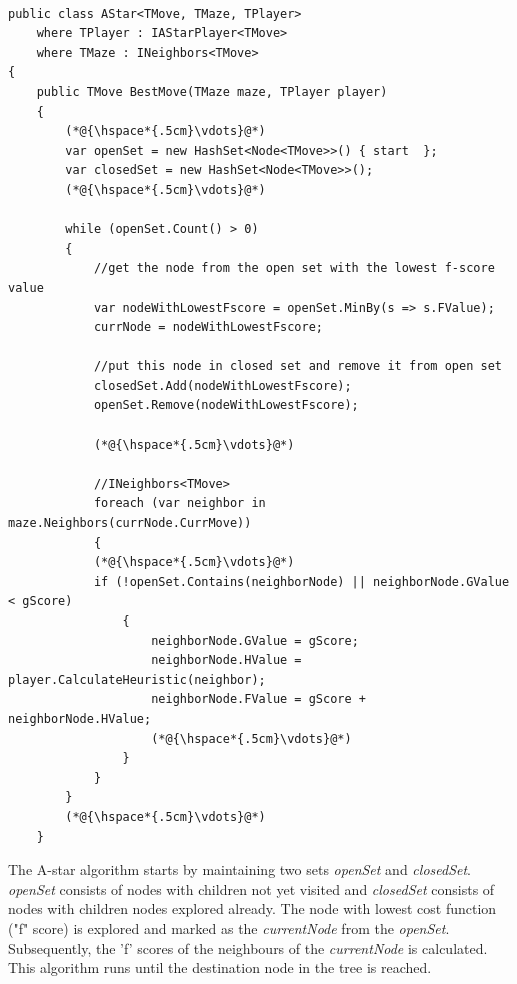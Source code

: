 \begin{lstlisting}

public class AStar<TMove, TMaze, TPlayer>
    where TPlayer : IAStarPlayer<TMove>
    where TMaze : INeighbors<TMove>
{
    public TMove BestMove(TMaze maze, TPlayer player)
    {
        (*@{\hspace*{.5cm}\vdots}@*)
        var openSet = new HashSet<Node<TMove>>() { start  };
        var closedSet = new HashSet<Node<TMove>>();
        (*@{\hspace*{.5cm}\vdots}@*)

        while (openSet.Count() > 0)
        {
            //get the node from the open set with the lowest f-score value
            var nodeWithLowestFscore = openSet.MinBy(s => s.FValue);
            currNode = nodeWithLowestFscore;

            //put this node in closed set and remove it from open set
            closedSet.Add(nodeWithLowestFscore);
            openSet.Remove(nodeWithLowestFscore);

            (*@{\hspace*{.5cm}\vdots}@*)
            
            //INeighbors<TMove>
            foreach (var neighbor in maze.Neighbors(currNode.CurrMove))
            {
            (*@{\hspace*{.5cm}\vdots}@*)
            if (!openSet.Contains(neighborNode) || neighborNode.GValue < gScore)
                {
                    neighborNode.GValue = gScore;
                    neighborNode.HValue = player.CalculateHeuristic(neighbor);
                    neighborNode.FValue = gScore + neighborNode.HValue;
                    (*@{\hspace*{.5cm}\vdots}@*)
                }
            }
        }
        (*@{\hspace*{.5cm}\vdots}@*)
    }

\end{lstlisting}

The A-star algorithm starts by maintaining two sets \textit{openSet} and \textit{closedSet}. \textit{openSet} consists of nodes with children not yet visited and \textit{closedSet} consists of nodes with children nodes explored already. The node with lowest cost function ("f" score) is explored and marked as the \textit{currentNode} from the \textit{openSet}. Subsequently, the 'f' scores of the neighbours of the \textit{currentNode} is calculated. This algorithm runs until the destination node in the tree is reached.

